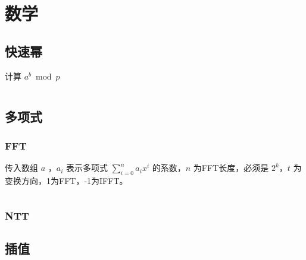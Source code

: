 \documentclass[a4paper, twoside]{article}
\title{\vspace{20cm}\fontsize{50pt}{20pt}\selectfont{Standard Code Library}\\\fontsize{24pt}{\baselineskip}\selectfont{}\vspace{0.1cm}}
\date{}
\begin{document}
\begin{titlepage}
	\selectfont{\color{black}{\maketitle}}
	\thispagestyle{empty}
	\afterpage{\null\thispagestyle{empty}\newpage} %
\end{titlepage}

\pagestyle{plain}
\setcounter{page}{1}
\renewcommand{\contentsname}{\Huge \textbf{目录}}           %
\renewcommand{\cftsecdotsep}{4}                             %
\renewcommand{\cftsubsecdotsep}{4}                          %
\renewcommand{\cftsecfont}{\large\bfseries}                 %
\begin{center}
    \tableofcontents
\end{center}

\newpage
\pagestyle{fancy}
\setcounter{page}{1}
\section{数学}
    \subsection{快速幂}
    计算 $a^b \bmod p$
    \inputminted{cpp}{../src/数学/快速幂.cpp}
    \subsection{多项式}
        \subsubsection{FFT}
        传入数组 $a$ ，$a_i$ 表示多项式 $\sum\limits_{i=0}^{n} a_ix^i$ 的系数，$n$ 为FFT长度，必须是 $2^k$，$t$ 为变换方向，1为FFT，-1为IFFT。
        \inputminted{cpp}{../src/数学/FFT.cpp}
        
        \subsubsection{NTT}

    \subsection{插值}
\end{document}
